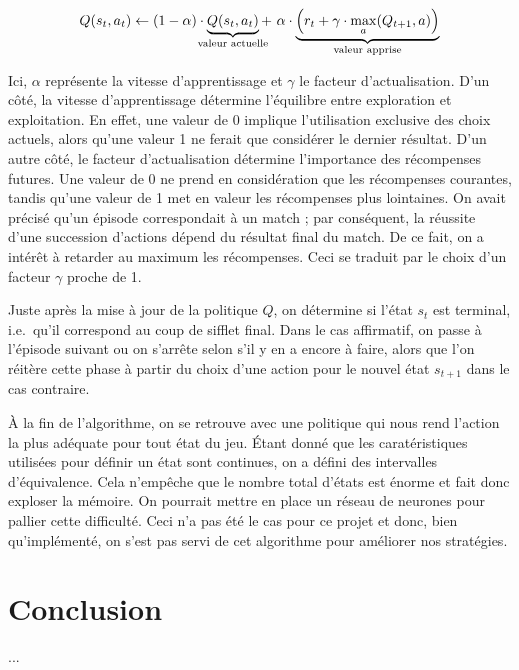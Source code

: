 \documentclass[12pt,a4paper]{article}
\begin{document}
\begin{equation*}
  Q(s_t,a_t) \gets (1-\alpha) \cdot 
  \underbrace{Q(s_t,a_t)}_{\mathclap{\text{valeur actuelle}}} + \ \alpha \cdot 
\underbrace{\Big(r_t + \gamma \cdot \max_a(Q_{t+1},a) 
  \Big)}_{\mathclap{\text{valeur   apprise}}}
\end{equation*}

Ici, $\alpha$ repr\'esente la vitesse d'apprentissage et $\gamma$ le facteur 
d'actualisation. D'un c\^ot\'e, la vitesse d'apprentissage d\'etermine 
l'\'equilibre entre exploration et exploitation. En effet, une valeur de 
0 implique l'utilisation exclusive des choix actuels, alors qu'une 
valeur 1 ne ferait que consid\'erer le dernier r\'esultat.
D'un autre c\^ot\'e, le facteur d'actualisation d\'etermine l'importance des 
r\'ecompenses futures. Une valeur de 0 ne prend en consid\'eration que les 
r\'ecompenses courantes, tandis qu'une valeur de 1 met en valeur les 
r\'ecompenses plus lointaines. On avait pr\'ecis\'e qu'un \'episode 
correspondait \`a un match ; par cons\'equent, la r\'eussite d'une succession 
d'actions d\'epend du r\'esultat final du match. De ce fait, on a int\'er\^et 
\`a retarder au maximum les r\'ecompenses. Ceci se traduit par le choix d'un 
facteur $\gamma$ proche de 1.

Juste apr\`es la mise \`a jour de la politique $Q$, on d\'etermine si l'\'etat 
$s_t$ est terminal, i.e.\ qu'il correspond au coup de sifflet final. Dans le 
cas affirmatif, on passe \`a l'\'episode suivant ou on s'arr\^ete selon s'il y 
en a encore \`a faire, alors que l'on r\'eit\`ere cette phase \`a partir du 
choix d'une action pour le nouvel \'etat $s_{t+1}$ dans le cas contraire.

\`A la fin de l'algorithme, on se retrouve avec une politique qui nous rend 
l'action la plus ad\'equate pour tout \'etat du jeu. \'Etant donn\'e que les 
carat\'eristiques utilis\'ees pour d\'efinir un \'etat sont continues, 
on a d\'efini des intervalles d'\'equivalence. Cela n'emp\^eche que le nombre 
total d'\'etats est \'enorme et fait donc exploser la m\'emoire. On pourrait 
mettre en place un r\'eseau de neurones pour pallier cette difficult\'e. Ceci 
n'a pas \'et\'e le cas pour ce projet et donc, bien qu'impl\'ement\'e, on 
s'est pas servi de cet algorithme pour am\'eliorer nos strat\'egies. 

\newpage

\part*{Conclusion}
...
\end{document}
